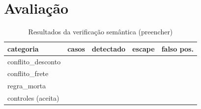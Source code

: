 \section{Avaliação}
%
%
%
\begin{table}[h]
  \caption{Resultados da verificação semântica (preencher)}
  \begin{tabular}{lrrrr}
    \toprule
    categoria & casos & detectado & escape & falso pos. \\
    \midrule
    conflito\_desconto & & & & \\
    conflito\_frete & & & & \\
    regra\_morta & & & & \\
    controles (aceita) & & & & \\
    \bottomrule
  \end{tabular}
\end{table}
